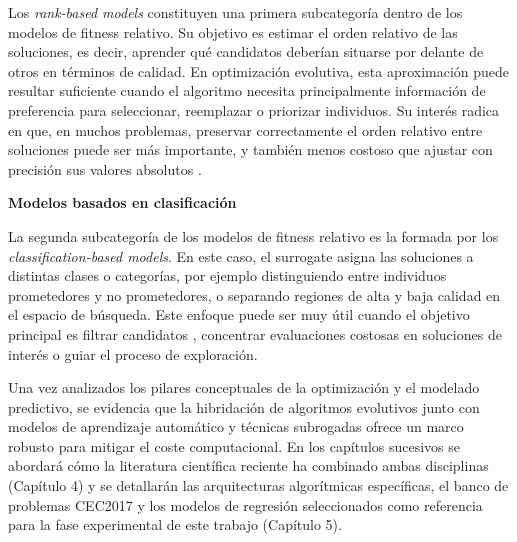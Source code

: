 Los \textit{rank-based models} constituyen una primera subcategoría dentro de los modelos de fitness relativo. Su objetivo es estimar el orden relativo de las soluciones, es decir, aprender qué candidatos deberían situarse por delante de otros en términos de calidad. En optimización evolutiva, esta aproximación puede resultar suficiente cuando el algoritmo necesita principalmente información de preferencia para seleccionar, reemplazar o priorizar individuos. Su interés radica en que, en muchos problemas, preservar correctamente el orden relativo entre soluciones puede ser más importante, y también menos costoso que ajustar con precisión sus valores absolutos \cite{yuxue2024effective}.

\smallskip
\noindent\textbf{Modelos basados en clasificación}\par
\smallskip

La segunda subcategoría de los modelos de fitness relativo es la formada por los \textit{classification-based models}. En este caso, el surrogate asigna las soluciones a distintas clases o categorías, por ejemplo distinguiendo entre individuos prometedores y no prometedores, o separando regiones de alta y baja calidad en el espacio de búsqueda. Este enfoque puede ser muy útil cuando el objetivo principal es filtrar candidatos \cite{jinglu2022classification,lin2023classification}, concentrar evaluaciones costosas en soluciones de interés o guiar el proceso de exploración.






Una vez analizados los pilares conceptuales de la optimización y el modelado predictivo, se evidencia que la hibridación de algoritmos evolutivos junto con modelos de aprendizaje automático y técnicas subrogadas ofrece un marco robusto para mitigar el coste computacional. En los capítulos sucesivos se abordará cómo la literatura científica reciente ha combinado ambas disciplinas (Capítulo 4) y se detallarán las arquitecturas algorítmicas específicas, el banco de problemas CEC2017 y los modelos de regresión seleccionados como referencia para la fase experimental de este trabajo (Capítulo 5).
